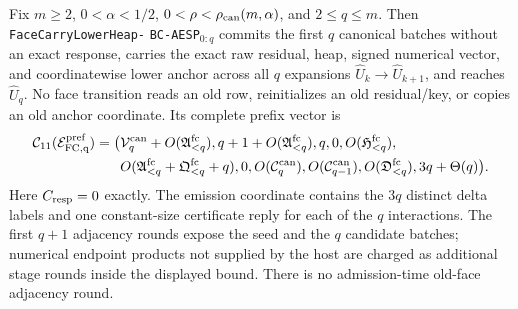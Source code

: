 \begin{theorem}
\label{thm:branch-caterpillar-incremental-face-handoff}
Fix $m\geq2$, $0<\alpha<1/2$,
$0<\rho<\rho_{\rm can}(m,\alpha)$, and $2\leq q\leq m$.
Then \texttt{FaceCarry}\allowbreak\texttt{LowerHeap-}\allowbreak
\texttt{BC-AESP}$_{0:q}$ commits the first $q$
canonical batches without an exact response, carries the exact raw residual,
heap, signed numerical vector, and coordinatewise lower anchor across all
$q$ expansions $\widehat U_k\to\widehat U_{k+1}$, and reaches
$\widehat U_q$.  No face transition reads an old row, reinitializes an old
residual/key, or copies an old anchor coordinate.  Its complete prefix vector
is
\begin{equation}
 \begin{aligned}
 \mathcal C_{11}(\mathcal E_{\rm FC,q}^{\rm pref})=\bigl(&
 \mathcal V_q^{\rm can}+O(\mathfrak A_{<q}^{\rm fc}),
 q+1+O(\mathfrak A_{<q}^{\rm fc}),q,0,
 O(\mathfrak H_{<q}^{\rm fc}),\\
 &O(\mathfrak A_{<q}^{\rm fc}+\mathfrak Q_{<q}^{\rm fc}+q),0,
 O(\mathcal C_q^{\rm can}),O(\mathcal C_{q-1}^{\rm can}),
 O(\mathfrak D_{<q}^{\rm fc}),3q+\Theta(q)\bigr).
 \end{aligned}
 \label{eq:branch-caterpillar-incremental-face-prefix-eleven-vector}
\end{equation}
Here $C_{\rm resp}=0$ exactly.  The emission coordinate contains the $3q$
distinct delta labels and one constant-size certificate reply for each of the
$q$ interactions.  The first $q+1$ adjacency rounds expose the seed and the
$q$ candidate batches; numerical endpoint products not supplied by the host
are charged as additional stage rounds inside the displayed bound.  There is
no admission-time old-face adjacency round.


\end{theorem}
